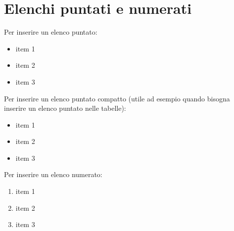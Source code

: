 \section{Elenchi puntati e numerati}

Per inserire un elenco puntato:

\begin{itemize}
\item item 1
\item item 2
\item item 3
\end{itemize}

Per inserire un elenco puntato compatto (utile ad esempio quando bisogna inserire un elenco puntato nelle tabelle):

\begin{itemize}[noitemsep,topsep=0pt,parsep=0pt,partopsep=0pt]
\item item 1
\item item 2
\item item 3
\end{itemize}

Per inserire un elenco numerato:

\begin{enumerate}
\item item 1
\item item 2
\item item 3
\end{enumerate}

\clearpage
